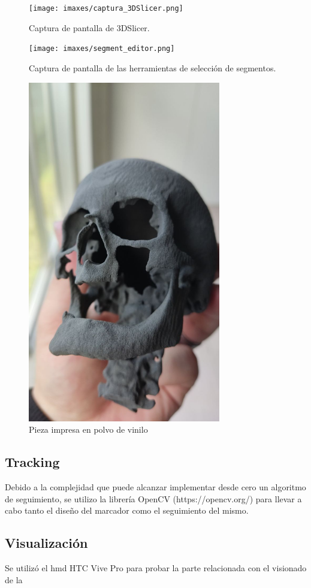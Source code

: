 \begin{figure}[hp!]
  \centering
  \texttt{[image: imaxes/captura\_3DSlicer.png]}
  \caption{Captura de pantalla de 3DSlicer.}
  \label{fig:cap3DSlicer}
\end{figure}
\begin{figure}[hp!]
  \centering
  \texttt{[image: imaxes/segment\_editor.png]}
  \caption{Captura de pantalla de las herramientas de selección de segmentos.}
  \label{fig:segmentEditor}
\end{figure}
\begin{figure}[hp!]
  \centering
  \includegraphics[width=0.75\textwidth]{imaxes/craneo_vinilo.jpg}
  \caption{Pieza impresa en polvo de vinilo}
  \label{fig:craneoVinilo}
\end{figure} 
\subsection{Tracking}
Debido a la complejidad que puede alcanzar implementar desde cero un algoritmo de seguimiento, se utilizo la librería OpenCV (https://opencv.org/) para llevar a cabo tanto el diseño del marcador como el seguimiento del mismo.

\subsection{Visualización}
Se utilizó el \acrshort{hmd} HTC Vive Pro para probar la parte relacionada con el visionado de la 
